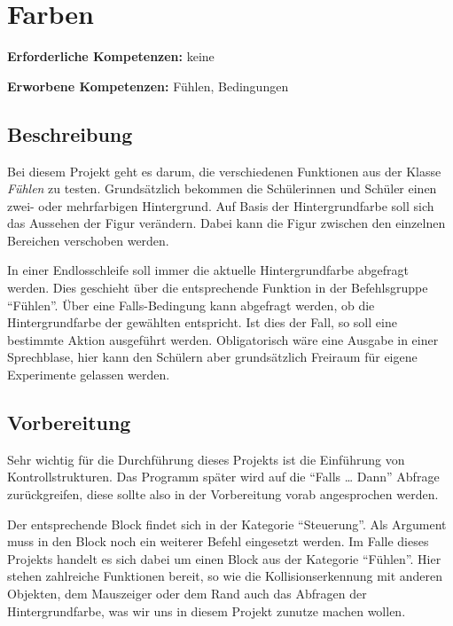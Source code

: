 \section{Farben}\label{farben}

\textbf{Erforderliche Kompetenzen:} keine

\textbf{Erworbene Kompetenzen:} Fühlen, Bedingungen

\begin{figure}[ht]
    \centering 
    \caption[\Sectionname]{\Sectionname}
\end{figure}

\subsection{Beschreibung}\label{beschreibung}

Bei diesem Projekt geht es darum, die verschiedenen Funktionen aus der
Klasse \emph{Fühlen} zu testen. Grundsätzlich bekommen die Schülerinnen
und Schüler einen zwei- oder mehrfarbigen Hintergrund. Auf Basis der
Hintergrundfarbe soll sich das Aussehen der Figur verändern. Dabei kann
die Figur zwischen den einzelnen Bereichen verschoben werden.

In einer Endlosschleife soll immer die aktuelle Hintergrundfarbe
abgefragt werden. Dies geschieht über die entsprechende Funktion in der
Befehlsgruppe ``Fühlen''. Über eine Falls-Bedingung kann abgefragt
werden, ob die Hintergrundfarbe der gewählten entspricht. Ist dies der
Fall, so soll eine bestimmte Aktion ausgeführt werden. Obligatorisch
wäre eine Ausgabe in einer Sprechblase, hier kann den Schülern aber
grundsätzlich Freiraum für eigene Experimente gelassen werden.

\subsection{Vorbereitung}\label{vorbereitung}

Sehr wichtig für die Durchführung dieses Projekts ist die Einführung von
Kontrollstrukturen. Das Programm später wird auf die ``Falls \ldots{}
Dann'' Abfrage zurückgreifen, diese sollte also in der Vorbereitung
vorab angesprochen werden.

Der entsprechende Block findet sich in der Kategorie ``Steuerung''. Als
Argument muss in den Block noch ein weiterer Befehl eingesetzt werden.
Im Falle dieses Projekts handelt es sich dabei um einen Block aus der
Kategorie ``Fühlen''. Hier stehen zahlreiche Funktionen bereit, so wie
die Kollisionserkennung mit anderen Objekten, dem Mauszeiger oder dem
Rand auch das Abfragen der Hintergrundfarbe, was wir uns in diesem
Projekt zunutze machen wollen.

